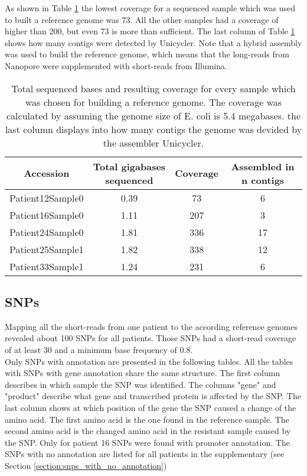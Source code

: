 As shown in Table \ref{table:sequencing} the lowest coverage for a sequenced sample which was used to built a reference genome was 73. All the other samples had a coverage of higher than 200, but even 73 is more than sufficient. The last column of Table \ref{table:sequencing} shows how many contigs were detected by Unicycler. Note that a hybrid assembly was used to build the reference genome, which means that the long-reads from Nanopore were supplemented with short-reads from Illumina. 
\begin{table}
	\begin{tabular}{|c c c c|}	
		\hline
		Accession & Total gigabases sequenced & Coverage & Assembled in n contigs \\ [0.5ex]
		\hline\hline
		Patient12Sample0 & 0.39 & 73 & 6 \\
		\hline
		Patient16Sample0 & 1.11 & 207 & 3 \\
		\hline
		Patient24Sample0 & 1.81 & 336 & 17\\
		\hline
		Patient25Sample1 & 1.82 & 338 & 12\\
		\hline
		Patient33Sample1 & 1.24 & 231 & 6 \\
		\hline
	\end{tabular}
	\caption{Total sequenced bases and resulting coverage for every sample which was chosen for building a reference genome. The coverage was calculated by assuming the genome size of E. coli is 5.4 megabases. the last column displays into how many contigs the genome was devided by the assembler Unicycler. }
	\label{table:sequencing}	
\end{table}

\subsection{SNPs}
Mapping all the short-reads from one patient to the according reference genomes revealed about 100 SNPs for all patients. Those SNPs had a short-read coverage of at least 30 and a minimum base frequency of 0.8. \\
Only SNPs with annotation are presented in the following tables. All the tables with SNPs with gene annotation share the same structure. The first column describes in which sample the SNP was identified. The columns "gene" and "product" describe what gene and transcribed protein is affected by the SNP. The last column shows at which position of the gene the SNP caused a change of the amino acid. The first amino acid is the one found in the reference sample. The second amino acid is the changed amino acid in the resistant sample caused by the SNP. 
Only for patient 16 SNPs were found with promoter annotation.
The SNPs with no annotation are listed for all patients in the supplementary (see Section \ref{section:snps_with_no_annotation}) 
